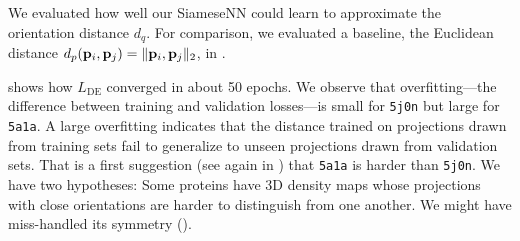 

We evaluated how well our SiameseNN could learn  to approximate the orientation distance $d_q$.
For comparison, we evaluated a baseline, the Euclidean distance $d_p(\mathbf{p}_i,\mathbf{p}_j) = \|\mathbf{p}_i, \mathbf{p}_j\|_2$, in .

 shows how $L_\text{DE}$ converged in about 50 epochs.
We observe that overfitting---the difference between training and validation losses---is small for \texttt{5j0n} but large for \texttt{5a1a}.
A large overfitting indicates that the distance trained on projections drawn from training sets fail to generalize to unseen projections drawn from validation sets.
That is a first suggestion (see again in ) that \texttt{5a1a} is harder than \texttt{5j0n}.
We have two hypotheses: Some proteins have 3D density maps whose projections with close orientations are harder to distinguish from one another.
We might have miss-handled its symmetry ().


